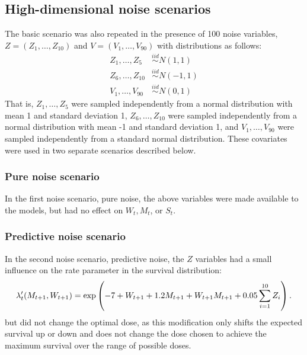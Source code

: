 \documentclass[12pt]{article}
\begin{document}


\subsection{High-dimensional noise scenarios} %
\label{sub:noise_variables}

The basic scenario was also repeated in the presence of 100 noise variables, $Z = (Z_{1}, \ldots, Z_{10})$ and $V = (V_{1}, \ldots, V_{90})$ with distributions as follows:
\begin{align}
  Z_{1}, \ldots, Z_{5} &\overset{iid}{\sim} N(1, 1) \\
  Z_{6}, \ldots, Z_{10} &\overset{iid}{\sim} N(-1, 1) \\
  V_{1}, \ldots, V_{90} &\overset{iid}{\sim} N(0, 1)
\end{align}
That is, $Z_{1}, \ldots, Z_{5}$ were sampled independently from a normal distribution with mean 1 and standard deviation 1, $Z_{6}, \ldots, Z_{10}$ were sampled independently from a normal distribution with mean -1 and standard deviation 1, and $V_{1}, \ldots, V_{90}$ were sampled independently from a standard normal distribution. These covariates were used in two separate scenarios described below.

\subsubsection{Pure noise scenario} %
\label{ssub:pure_noise}

In the first noise scenario, pure noise, the above variables were made available to the models, but had no effect on $W_{t}, M_{t}$, or $S_{t}$.


\subsubsection{Predictive noise scenario} %
\label{ssub:predictive_noise}
In the second noise scenario, predictive noise, the $Z$ variables had a small influence on the rate parameter in the survival distribution:
\begin{equation}
  \lambda'_{t}(M_{t+1}, W_{t+1}) = \exp\del{-7 + W_{t+1} + 1.2 M_{t+1} + W_{t+1} M_{t+1} + 0.05 \sum_{i = 1}^{10} Z_{i}}.
\end{equation}
but did not change the optimal dose, as this modification only shifts the expected survival up or down and does not change the dose chosen to achieve the maximum survival over the range of possible doses.
\end{document}
